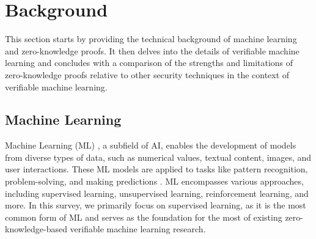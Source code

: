 \documentclass[journal]{IEEEtran}
\begin{document}
\section{Background}\label{s:bg}

This section starts by providing the technical background of machine learning and zero-knowledge proofs. It then delves into the details of verifiable machine learning and concludes with a comparison of the strengths and limitations of zero-knowledge proofs relative to other security techniques in the context of verifiable machine learning.

\subsection{Machine Learning}\label{ss:2a}



Machine Learning (ML) \cite{jordan2015machine}, a subfield of AI, enables the development of models from diverse types of data, such as numerical values, textual content, images, and user interactions. These ML models are applied to tasks like pattern recognition, problem-solving, and making predictions \cite{janiesch2021machine}. ML encompasses various approaches, including supervised learning, unsupervised learning, reinforcement learning, and more. In this survey, we primarily focus on supervised learning, as it is the most common form of ML and serves as the foundation for the most of existing zero-knowledge-based verifiable machine learning research.
\end{document}
